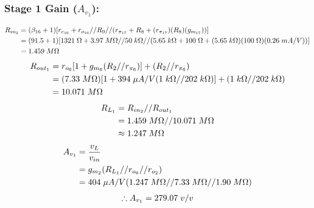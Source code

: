 \documentclass{article}
\begin{document}
	\subsubsection*{Stage 1 Gain ($A_{v_1}$):}
	\begin{align*}
		R_{in_2} &= (\beta_{16} + 1) [r_{e_{16}} + r_{o_{16}} // R_9 // (r_{\pi_{17}} + R_8 + (r_{\pi_{17}}) (R_8) (g_{m_{17}}))]\\
		&= (91.5 + 1)[1321 \hspace{1mm} \Omega + 3.97 \hspace{1mm} M\Omega // 50 \hspace{1mm} k\Omega // (5.65 \hspace{1mm} k\Omega + 100 \hspace{1mm} \Omega + (5.65 \hspace{1mm} k\Omega)(100 \hspace{1mm} \Omega)(0.26 \hspace{1mm} mA/V))]\\
		&= 1.459 \hspace{1mm} M\Omega
	\end{align*}	
	\begin{align*}
		R_{out_1} &= r_{o_6} [1 + g_{m_6} (R_2 // r_{\pi_6})] + (R_2 // r_{\pi_6})\\
		&= (7.33 \hspace{1mm} M\Omega) [1 + 394 \hspace{1mm}\mu A/V (1 \hspace{1mm} k\Omega // 202 \hspace{1mm} k\Omega)] + (1 \hspace{1mm} k\Omega // 202 \hspace{1mm} k\Omega)\\
		&= 10.071 \hspace{1mm} M\Omega 
	\end{align*}	
	\begin{align*}
		R_{L_1} &= R_{in_2} // R_{out_1}\\
		&= 1.459 \hspace{1mm} M\Omega // 10.071 \hspace{1mm} M\Omega\\
		&\approx 1.247 \hspace{1mm} M\Omega
	\end{align*}
	\begin{align*}
		A_{v_1} &= \frac{v_L}{v_{in}}\\
		&= g_{m_2} (R_{L_1} // r_{o_6} // r_{o_2})\\
		&= 404 \hspace{1mm} \mu A/V (1.247 \hspace{1mm} M\Omega // 7.33 \hspace{1mm} M\Omega // 1.90 \hspace{1mm} M\Omega)
	\end{align*}
	\begin{align*}
		\therefore A_{v_1} = 279.07 \hspace{1mm} v/v
	\end{align*}
	
\end{document}

